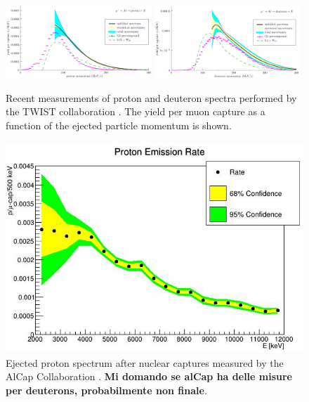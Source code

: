\documentclass[12pt,a4paper,openright, oneside, titlepage]{book} %
\begin{document}
\begin{figure}[h!]
\centering
\includegraphics[width=0.49\textwidth]{new_spectra_2/Gaponenko_protons}\hfill
\includegraphics[width=0.49\textwidth]{new_spectra_2/Gaponenko_deuterons}
\caption{Recent measurements of proton and deuteron spectra performed
by the TWIST collaboration \cite{TWIST:2020}. 
The yield per muon capture as a function of the ejected particle momentum is shown.}
\label{_TWIST}
\end{figure}

\begin{figure}[h!]
\centering
\includegraphics[scale=0.6]{new_spectra_2/Quirk_protons}
\caption{Ejected proton spectrum after nuclear captures measured by the AlCap Collaboration \cite{AlCap:2020}. 
{\bf{Mi domando se alCap ha delle misure per deuterons, probabilmente non finale}}.}
\label{_AlCap}
\end{figure}
\end{document}
